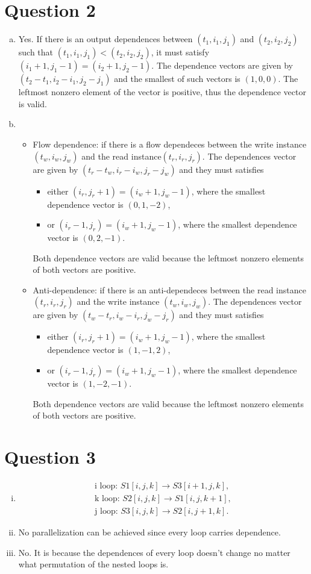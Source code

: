 \documentclass[11pt]{amsart}
\begin{document}
\section*{Question 2}
\begin{enumerate}[(a)]
\item Yes. If there is an output dependences between $(t_1,i_1,j_1)$ and $(t_2,i_2,j_2)$ such that $(t_1,i_1,j_1)<(t_2,i_2,j_2)$, it must satisfy $(i_1+1, j_1-1) = (i_2+1, j_2-1)$. The dependence vectors are given by $(t_2-t_1,i_2-i_1,j_2-j_1)$ and the smallest of such vectors is $(1, 0, 0)$. The leftmost nonzero element of the vector is positive, thus the dependence vector is valid.
\item 
\begin{itemize}
\item Flow dependence: if there is a flow dependeces between the write instance $(t_w, i_w, j_w)$ and the read instance$(t_r, i_r, j_r)$. The dependences vector are given by $(t_r-t_w,i_r-i_w,j_r-j_w)$ and they must satisfies
\begin{itemize}
\item either $(i_r,j_r+1) = (i_w+1,j_w-1)$, where the smallest dependence vector is $(0,1,-2)$,
\item or $(i_r-1,j_r) = (i_w+1,j_w-1)$, where the smallest dependence vector is $(0,2,-1)$.
\end{itemize}
Both dependence vectors are valid because the leftmost nonzero elements of both vectors are positive.
\item Anti-dependence: if there is an anti-dependeces between the read instance$(t_r, i_r, j_r)$ and the write instance $(t_w, i_w, j_w)$. The dependences vector are given by $(t_w-t_r,i_w-i_r,j_w-j_r)$ and they must satisfies
\begin{itemize}
\item either $(i_r,j_r+1) = (i_w+1,j_w-1)$, where the smallest dependence vector is $(1,-1,2)$,
\item or $(i_r-1,j_r) = (i_w+1,j_w-1)$, where the smallest dependence vector is $(1,-2,-1)$.
\end{itemize}
Both dependence vectors are valid because the leftmost nonzero elements of both vectors are positive.
\end{itemize}
\end{enumerate}
\newpage
\section*{Question 3}
\begin{enumerate}[(i)]
\item 
\begin{align*}
\text{i loop: } S1[i,j,k]\to S3[i+1,j,k], \\
\text{k loop: } S2[i,j,k]\to S1[i,j,k+1], \\
\text{j loop: }S3[i,j,k]\to S2[i,j+1,k].
\end{align*}
\item No parallelization can be achieved since every loop carries dependence.
\item No. It is because the dependences of every loop doesn't change no matter what permutation of the nested loops is.
\end{enumerate}
\vfill
\end{document}

